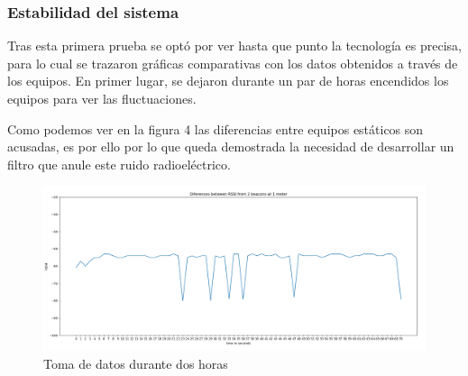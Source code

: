 \documentclass[paper=a4, fontsize=11pt,twoside]{scrartcl}
\begin{document}
        \subsubsection{Estabilidad del sistema}
            Tras esta primera prueba se optó por ver hasta que punto la tecnología es precisa, para lo cual se trazaron gráficas comparativas
            con los datos obtenidos a través de los equipos. En primer lugar, se dejaron durante un par de horas encendidos los equipos para ver las 
            fluctuaciones.

            Como podemos ver en la figura 4 las diferencias entre equipos estáticos son acusadas, es por ello por lo que queda demostrada la necesidad de
            desarrollar un filtro que anule este ruido radioeléctrico.
            \begin{center}
                \begin{figure}[]
                    \centering
                    \includegraphics[width=1\textwidth]{../../Memmory/images/5min_beacon_rssi.PNG}
                    \caption{Toma de datos durante dos horas}
                    \label{fig:mesh15}
                \end{figure}
            \end{center}
\end{document}
